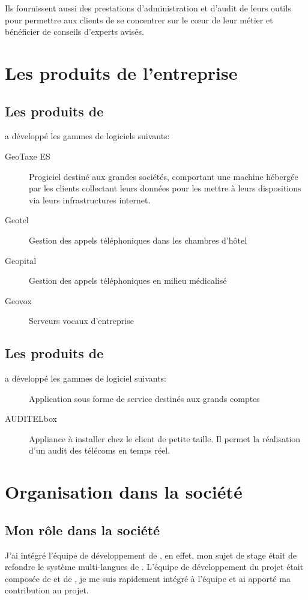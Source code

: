 	Ils fournissent aussi des prestations d’administration et d’audit de leurs outils pour permettre aux clients de se concentrer sur le
	c\oe{}ur de leur métier et bénéficier de conseils d’experts avisés.
	
	\section{Les produits de l'entreprise}
		\subsection{Les produits de \techno{}}
		\techno{} a développé les gammes de logiciels suivants:
		\begin{description}	
			\item[GeoTaxe ES] Progiciel destiné aux grandes sociétés, comportant une machine hébergée par les clients collectant leurs données pour les mettre à leurs dispositions via leurs infrastructures internet.
			\item[Geotel] Gestion des appels téléphoniques dans les chambres d'hôtel
			\item[Geopital] Gestion des appels téléphoniques en milieu médicalisé
			\item[Geovox] Serveurs vocaux d'entreprise
		\end{description}
		\subsection{Les produits de \memobox{}}
		\memobox{} a développé les gammes de logiciel suivants:
		\begin{description}	
			\item[\adt{}] Application sous forme de service destinés aux grands comptes
			\item[AUDITELbox] Appliance à installer chez le client de petite taille. Il permet la réalisation d'un audit des télécoms en temps réel.
		\end{description}

	\section{Organisation dans la société}
	\subsection{Mon rôle dans la société}
		J'ai intégré l'équipe de développement de \adt{}, en effet, mon sujet de stage était de refondre le système multi-langues de \adt{}. L'équipe de développement du projet était composée de \Romain{} et de \Denis{}, je me suis rapidement intégré
à l'équipe et ai apporté ma contribution au projet.

